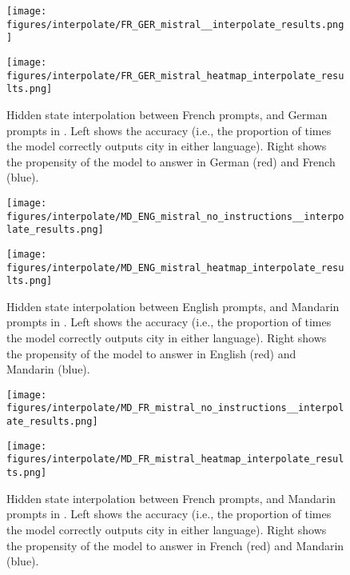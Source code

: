 \begin{figure}[h]
\begin{minipage}{0.49\textwidth}
    \centering
    \texttt{[image: figures/interpolate/FR\_GER\_mistral\_\_interpolate\_results.png]} 
\end{minipage}
\begin{minipage}{0.49\textwidth}
    \centering
    \texttt{[image: figures/interpolate/FR\_GER\_mistral\_heatmap\_interpolate\_results.png]} 
\end{minipage}
\caption{Hidden state interpolation between French prompts, and German prompts in \mistral. Left shows the accuracy (i.e., the proportion of times the model correctly outputs city in either language). Right shows the propensity of the model to answer in German (red) and French (blue). }
\end{figure}

\begin{figure}[h]
\begin{minipage}{0.49\textwidth}
    \centering
    \texttt{[image: figures/interpolate/MD\_ENG\_mistral\_no\_instructions\_\_interpolate\_results.png]} 
\end{minipage}
\begin{minipage}{0.49\textwidth}
    \centering
    \texttt{[image: figures/interpolate/MD\_ENG\_mistral\_heatmap\_interpolate\_results.png]} 
\end{minipage}
\caption{Hidden state interpolation between English prompts, and Mandarin prompts in \mistral. Left shows the accuracy (i.e., the proportion of times the model correctly outputs city in either language). Right shows the propensity of the model to answer in English (red) and Mandarin (blue). }
\end{figure}


\begin{figure}[h]
\begin{minipage}{0.49\textwidth}
    \centering
    \texttt{[image: figures/interpolate/MD\_FR\_mistral\_no\_instructions\_\_interpolate\_results.png]} 
\end{minipage}
\begin{minipage}{0.49\textwidth}
    \centering
    \texttt{[image: figures/interpolate/MD\_FR\_mistral\_heatmap\_interpolate\_results.png]} 
\end{minipage}
\caption{Hidden state interpolation between French prompts, and Mandarin prompts in \mistral. Left shows the accuracy (i.e., the proportion of times the model correctly outputs city in either language). Right shows the propensity of the model to answer in French (red) and Mandarin (blue). }
\end{figure}

